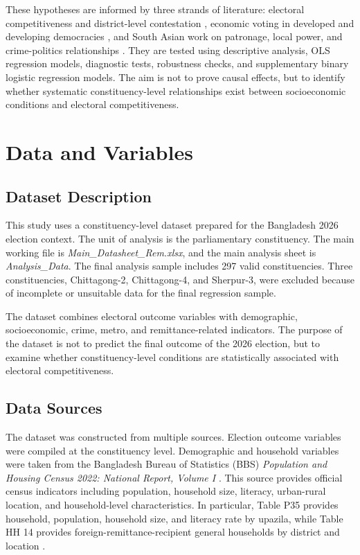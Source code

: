 \documentclass[12pt,a4paper]{article}
\begin{document}
These hypotheses are informed by three strands of literature: electoral competitiveness and district-level contestation \citep{blais2009,cox2020,gerring2015}, economic voting in developed and developing democracies \citep{lewisbeck2000,duch2008,oganesyan2014}, and South Asian work on patronage, local power, and crime-politics relationships \citep{kitschelt2007,vaishnav2017,lewis2022}. They are tested using descriptive analysis, OLS regression models, diagnostic tests, robustness checks, and supplementary binary logistic regression models. The aim is not to prove causal effects, but to identify whether systematic constituency-level relationships exist between socioeconomic conditions and electoral competitiveness.

\section{Data and Variables}

\subsection{Dataset Description}

This study uses a constituency-level dataset prepared for the Bangladesh 2026 election context. The unit of analysis is the parliamentary constituency. The main working file is \textit{Main\_Datasheet\_Rem.xlsx}, and the main analysis sheet is \textit{Analysis\_Data}. The final analysis sample includes 297 valid constituencies. Three constituencies, Chittagong-2, Chittagong-4, and Sherpur-3, were excluded because of incomplete or unsuitable data for the final regression sample.

The dataset combines electoral outcome variables with demographic, socioeconomic, crime, metro, and remittance-related indicators. The purpose of the dataset is not to predict the final outcome of the 2026 election, but to examine whether constituency-level conditions are statistically associated with electoral competitiveness.

\subsection{Data Sources}

The dataset was constructed from multiple sources. Election outcome variables were compiled at the constituency level. Demographic and household variables were taken from the Bangladesh Bureau of Statistics (BBS) \textit{Population and Housing Census 2022: National Report, Volume I} \citep{bbs2023}. This source provides official census indicators including population, household size, literacy, urban-rural location, and household-level characteristics. In particular, Table P35 provides household, population, household size, and literacy rate by upazila, while Table HH 14 provides foreign-remittance-recipient general households by district and location \citep{bbs2023}.
\end{document}
